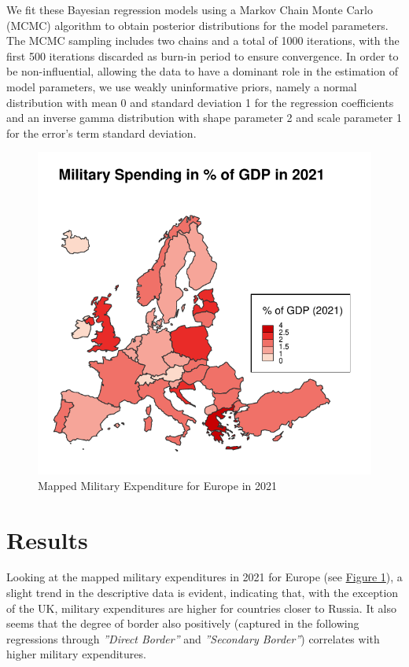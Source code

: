 \documentclass[12pt,a4paper]{article}
\begin{document}
We fit these Bayesian regression models using a Markov Chain Monte Carlo (MCMC) algorithm to obtain posterior distributions for the model parameters. The MCMC sampling includes two chains and a total of 1000 iterations, with the first 500 iterations discarded as burn-in period to ensure convergence. In order to be non-influential, allowing the data to have a dominant role in the estimation of model parameters, we use weakly uninformative priors, namely a normal distribution with mean 0 and standard deviation 1 for the regression coefficients and an inverse gamma distribution with shape parameter 2 and scale parameter 1 for the error's term standard deviation.
\begin{figure}[h]
\center
\label{F:1}
\includegraphics[scale=0.75]{Map1.pdf}
\caption{Mapped Military Expenditure for Europe in 2021}
\end{figure}
\section{Results}
Looking at the mapped military expenditures in 2021 for Europe (see \hyperref[F:1]{\color{blue}Figure 1}), a slight trend in the descriptive data is evident, indicating that, with the exception of the UK, military expenditures are higher for countries closer to Russia. It also seems that the degree of border also positively (captured in the following regressions through \textit{''Direct Border''} and \textit{''Secondary Border''}) correlates with higher military expenditures. 
\end{document}
